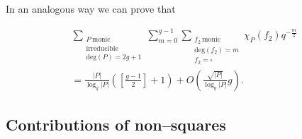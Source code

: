 \documentclass[11pt]{amsart}
\begin{document}
In an analogous way we can prove that

\begin{prop}
\label{prop3.2}
\begin{multline}
\sum_{\substack{P \ \mathrm{monic} \\ \mathrm{irreducible} \\ \mathrm{deg}(P)=2g+1}}\sum_{m=0}^{g-1}\sum_{\substack{f_{2} \ \mathrm{monic} \\ \mathrm{deg}(f_{2})=m \\ f_{2}=\square}}\chi_{P}(f_{2})q^{-\tfrac{m}{2}}\nonumber\\
=\frac{|P|}{\log_{q}|P|}\left(\left[\frac{g-1}{2}\right]+1\right)+O\left(\frac{\sqrt{|P|}}{\log_{q}|P|}g\right).
\end{multline}
\end{prop}

\subsection{Contributions of non--squares}
\end{document}
